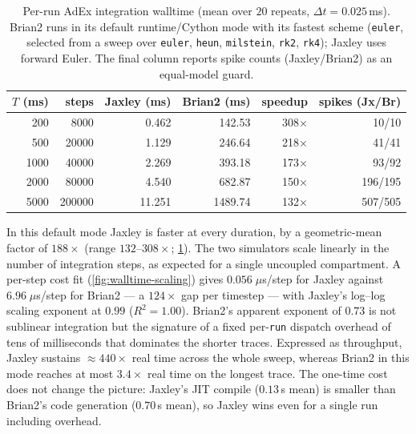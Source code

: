 \begin{table}[!hb]
  \centering
  \caption{Per-run \gls{AdEx} integration walltime (mean over $20$ repeats, $\Delta t = 0.025$\,ms).
  Brian2 runs in its default runtime/Cython mode with its fastest scheme (\texttt{euler}, selected from a sweep over \texttt{euler}, \texttt{heun}, \texttt{milstein}, \texttt{rk2}, \texttt{rk4}); Jaxley uses forward Euler.
  The final column reports spike counts (Jaxley/Brian2) as an equal-model guard.}
  \label{tab:walltime}
  \footnotesize
  \setlength{\tabcolsep}{3pt}
  \begin{tabular}{rrrrrr}
    \toprule
    $T$ (ms) & steps & Jaxley (ms) & Brian2 (ms) & speedup & spikes (Jx/Br) \\
    \midrule
    200 & 8000 & 0.462 & 142.53 & 308$\times$ & 10/10 \\
    500 & 20000 & 1.129 & 246.64 & 218$\times$ & 41/41 \\
    1000 & 40000 & 2.269 & 393.18 & 173$\times$ & 93/92 \\
    2000 & 80000 & 4.540 & 682.87 & 150$\times$ & 196/195 \\
    5000 & 200000 & 11.251 & 1489.74 & 132$\times$ & 507/505 \\
    \bottomrule
  \end{tabular}
\end{table}

In this default mode Jaxley is faster at every duration, by a geometric-mean factor of $188\times$ (range $132$--$308\times$; \cref{tab:walltime}).
The two simulators scale linearly in the number of integration steps, as expected for a single uncoupled compartment.
A per-step cost fit (\cref{fig:walltime-scaling}) gives $0.056\;\mu$s/step for Jaxley against $6.96\;\mu$s/step for Brian2 --- a $124\times$ gap per timestep --- with Jaxley's log--log scaling exponent at $0.99$ ($R^2 = 1.00$).
Brian2's apparent exponent of $0.73$ is not sublinear integration but the signature of a fixed per-\texttt{run} dispatch overhead of tens of milliseconds that dominates the shorter traces.
Expressed as throughput, Jaxley sustains $\approx 440\times$ real time across the whole sweep, whereas Brian2 in this mode reaches at most $3.4\times$ real time on the longest trace.
The one-time cost does not change the picture: Jaxley's \gls{JIT} compile ($0.13$\,s mean) is smaller than Brian2's code generation ($0.70$\,s mean), so Jaxley wins even for a single run including overhead.

